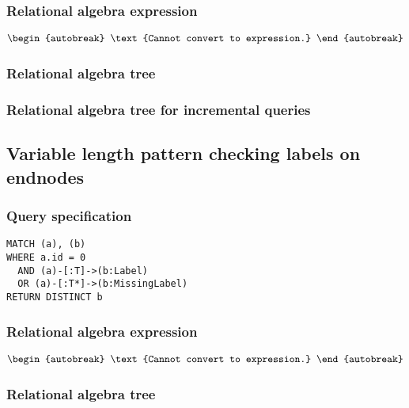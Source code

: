 \subsubsection*{Relational algebra expression}

\begin{align*}
\begin{autobreak}
\text{Cannot convert to expression.}
\end{autobreak}
\end{align*}

\subsubsection*{Relational algebra tree}


\subsubsection*{Relational algebra tree for incremental queries}


\subsection{Variable length pattern checking labels on endnodes}

\subsubsection*{Query specification}

\begin{lstlisting}
MATCH (a), (b)
WHERE a.id = 0
  AND (a)-[:T]->(b:Label)
  OR (a)-[:T*]->(b:MissingLabel)
RETURN DISTINCT b
\end{lstlisting}

\subsubsection*{Relational algebra expression}

\begin{align*}
\begin{autobreak}
\text{Cannot convert to expression.}
\end{autobreak}
\end{align*}

\subsubsection*{Relational algebra tree}


